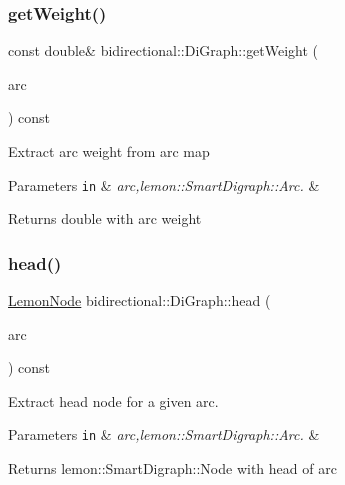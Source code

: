 \subsubsection{\texorpdfstring{get\+Weight()}{getWeight()}}
{\footnotesize\ttfamily const double\& bidirectional\+::\+Di\+Graph\+::get\+Weight (\begin{DoxyParamCaption}\item[{const \hyperlink{digraph_8h_a0f10c67f03c054baec3e3bab6a92171e}{Lemon\+Arc} \&}]{arc }\end{DoxyParamCaption}) const\hspace{0.3cm}{\ttfamily [inline]}}

Extract arc weight from arc map


\begin{DoxyParams}[1]{Parameters}
\mbox{\tt in}  & {\em arc,lemon\+::\+Smart\+Digraph\+::\+Arc.} & \\
\hline
\end{DoxyParams}
\begin{DoxyReturn}{Returns}
double with arc weight 
\end{DoxyReturn}
\mbox{\label{classbidirectional_1_1DiGraph_aa0379cf603a76b85a8ef3ca5ad03d4af}} 
\subsubsection{\texorpdfstring{head()}{head()}}
{\footnotesize\ttfamily \hyperlink{digraph_8h_a952c6b935f7521c3435dbd13b255246b}{Lemon\+Node} bidirectional\+::\+Di\+Graph\+::head (\begin{DoxyParamCaption}\item[{const \hyperlink{digraph_8h_a0f10c67f03c054baec3e3bab6a92171e}{Lemon\+Arc} \&}]{arc }\end{DoxyParamCaption}) const\hspace{0.3cm}{\ttfamily [inline]}}

Extract head node for a given arc.


\begin{DoxyParams}[1]{Parameters}
\mbox{\tt in}  & {\em arc,lemon\+::\+Smart\+Digraph\+::\+Arc.} & \\
\hline
\end{DoxyParams}
\begin{DoxyReturn}{Returns}
lemon\+::\+Smart\+Digraph\+::\+Node with head of arc 
\end{DoxyReturn}
\mbox{\label{classbidirectional_1_1DiGraph_a0be9d9f87409f523306babcfef8a7f46}} 
